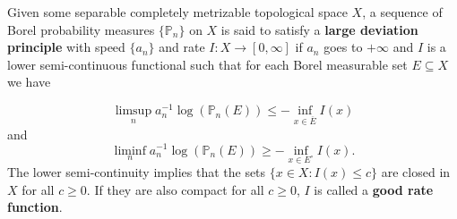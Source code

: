 \begin{definition}\label{def:LDP}
	Given some separable completely metrizable topological space
	$X$, a sequence of Borel probability measures $\{\mathbb P_n\}$ on $X$ is said to satisfy a \textbf{large deviation principle} with speed $\{a_n\}$ and rate $I:X\rightarrow [0,\infty]$ if $a_n$ goes to $+\infty$ and $I$ is a lower semi-continuous functional such that for each Borel measurable set $E\subseteq X$ we have
	
	$$\limsup_n a_n^{-1}\log(\mathbb P_n(E))\leq -\inf_{x\in \overline E}I(x)$$
	and
	$$\liminf_n a_n^{-1}\log(\mathbb P_n(E))\geq -\inf_{x\in E^\circ}I(x).$$
	The lower semi-continuity implies that the sets $\{x\in X: I(x)\leq c\}$ are closed in $X$ for all $c\geq 0$. If they are also compact for all $c\geq 0$, $I$ is called a \textbf{good rate function}.
\end{definition}


	
	


